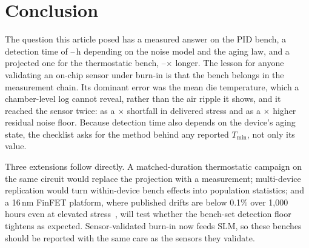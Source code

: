 \documentclass[10pt,twocolumn]{article}
\newcommand{\Tmin}{T_{\min}}
\begin{document}
\section{Conclusion}

The question this article posed has a measured answer on the PID bench, a detection time of \vTminSeq--\vTminLrv\,h depending on the noise model and the aging law, and a projected one for the thermostatic bench, \vPenLow--\vPenHigh$\times$ longer. The lesson for anyone validating an on-chip sensor under burn-in is that the bench belongs in the measurement chain. Its dominant error was the mean die temperature, which a chamber-level log cannot reveal, rather than the air ripple it shows, and it reached the sensor twice: as a \vAFratio$\times$ shortfall in delivered stress and as a \vSigRawRatio$\times$ higher residual noise floor. Because detection time also depends on the device's aging state, the checklist asks for the method behind any reported $\Tmin$, not only its value.

Three extensions follow directly. A matched-duration thermostatic campaign on the same circuit would replace the projection with a measurement; multi-device replication would turn within-device bench effects into population statistics; and a 16\,nm FinFET platform, where published drifts are below 0.1\% over 1,000 hours even at elevated stress~\cite{sobas}, will test whether the bench-set detection floor tightens as expected. Sensor-validated burn-in now feeds SLM, so these benches should be reported with the same care as the sensors they validate.
\end{document}
